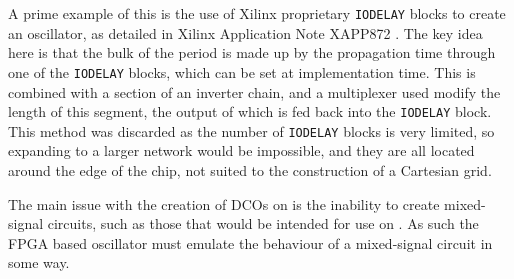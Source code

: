 A prime example of this is the use of Xilinx proprietary \texttt{IODELAY} blocks to create an oscillator, as detailed in Xilinx Application Note XAPP872 \cite{iodelay}. The key idea here is that the bulk of the period is made up by the propagation time through one of the \texttt{IODELAY} blocks, which can be set at implementation time. This is combined with a section of an inverter chain, and a multiplexer used modify the length of this segment, the output of which is fed back into the \texttt{IODELAY} block. This method was discarded as the number of \texttt{IODELAY} blocks is very limited, so expanding to a larger network would be impossible, and they are all located around the edge of the chip, not suited to the construction of a Cartesian grid.

The main issue with the creation of \acp{DCO} on  is the inability to create mixed-signal circuits, such as those that would be intended for use on . As such the \ac{FPGA} based oscillator must emulate the behaviour of a mixed-signal circuit in some way.

